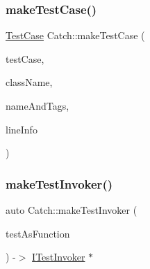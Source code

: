 \mbox{\label{namespace_catch_a5e63df38d06a43d4cee17454e724b5c0}} 
\subsubsection{\texorpdfstring{make\+Test\+Case()}{makeTestCase()}}
{\footnotesize\ttfamily \mbox{\hyperlink{class_catch_1_1_test_case}{Test\+Case}} Catch\+::make\+Test\+Case (\begin{DoxyParamCaption}\item[{\mbox{\hyperlink{struct_catch_1_1_i_test_invoker}{I\+Test\+Invoker}} $\ast$}]{test\+Case,  }\item[{std\+::string const \&}]{class\+Name,  }\item[{\mbox{\hyperlink{struct_catch_1_1_name_and_tags}{Name\+And\+Tags}} const \&}]{name\+And\+Tags,  }\item[{\mbox{\hyperlink{struct_catch_1_1_source_line_info}{Source\+Line\+Info}} const \&}]{line\+Info }\end{DoxyParamCaption})}

\mbox{\label{namespace_catch_ab3d8ccbc900fe50322c39ecbba52f536}} 
\subsubsection{\texorpdfstring{make\+Test\+Invoker()}{makeTestInvoker()}\hspace{0.1cm}{\footnotesize\ttfamily [1/2]}}
{\footnotesize\ttfamily auto Catch\+::make\+Test\+Invoker (\begin{DoxyParamCaption}\item[{void($\ast$)()}]{test\+As\+Function }\end{DoxyParamCaption}) -\/$>$  \mbox{\hyperlink{struct_catch_1_1_i_test_invoker}{I\+Test\+Invoker}} $\ast$\hspace{0.3cm}{\ttfamily [noexcept]}}

\mbox{\label{namespace_catch_a82a954c4d70afa716115820dc7dc8d24}} 
